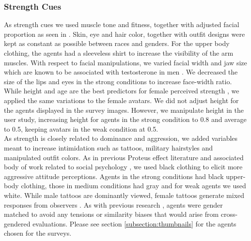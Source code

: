\subsubsection{Strength Cues}
As strength cues we used muscle tone and fitness, together with adjusted facial proportion as seen in \cite{windhager2011geometric}. Skin, eye and hair color, together with outfit designs were kept as constant as possible between races and genders. For the upper body clothing, the agents had a sleeveless shirt to increase the visibility of the arm muscles. 
With respect to facial manipulations, we varied facial width and jaw size which are known to be associated with testosterone in men \cite{lefevre2013telling}. We decreased the size of the lips and eyes in the strong conditions to increase face-width ratio. While height and age are the best predictors for female perceived strength \cite{sell2008human}, we applied the same variations to the female avatars. We did not adjust height for the agents displayed in the survey images. However, we manipulate height in the user study, increasing height for agents in the strong condition to 0.8 and average to 0.5, keeping avatars in the weak condition at 0.5.  
\\
As strength is closely related to dominance and aggression, we added variables meant to increase intimidation such as tattoos, military hairstyles and manipulated outfit colors. As in previous Proteus effect literature and associated body of work related to social psychology \cite{yee2009proteus,pena2009priming}, we used black clothing to elicit more aggressive attitude perceptions. Agents in the strong conditions had black upper-body clothing, those in medium conditions had gray and for weak agents we used white. While male tattoos are dominantly viewed, female tattoos generate mixed responses from observers \cite{wohlrab2009perception}. As with previous research \cite{van2013proteus}, agents were gender matched to avoid any tensions or similarity biases that would arise from cross-gendered evaluations. Please see section \ref{subsection:thumbnails} for the agents chosen for the surveys.

